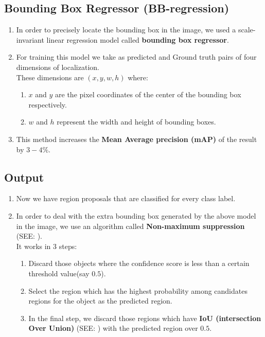 \subsection{Bounding Box Regressor (BB-regression) \cite{https://www.geeksforgeeks.org/r-cnn-region-based-cnns/}}\label{Bounding Box Regressor (BB-regression)}

\begin{enumerate}
    \item In order to precisely locate the bounding box in the image, we used a scale-invariant linear regression model called \textbf{bounding box regressor}.

    \item For training this model we take as predicted and Ground truth pairs of four dimensions of localization.\\
    These dimensions are $(x, y, w, h)$ where:
    \begin{enumerate}
        \item $x$ and $y$ are the pixel coordinates of the center of the bounding box respectively. 

        \item $w$ and $h$ represent the width and height of bounding boxes.
    \end{enumerate}
    
    \item This method increases the \textbf{Mean Average precision (mAP)} of the result by $3-4\%$.
    
\end{enumerate}



\subsection*{Output}
\begin{enumerate}
    \item Now we have region proposals that are classified for every class label. 
    
    \item In order to deal with the extra bounding box generated by the above model in the image, we use an algorithm called \textbf{Non-maximum suppression} (SEE: ).\\
    It works in 3 steps:
    \begin{enumerate}
        \item Discard those objects where the confidence score is less than a certain threshold value(say $0.5$).

        \item Select the region which has the highest probability among candidates regions for the object as the predicted region.

        \item In the final step, we discard those regions which have \textbf{IoU (intersection Over Union)} (SEE: ) with the predicted region over $0.5$.

    \end{enumerate}
\end{enumerate}

